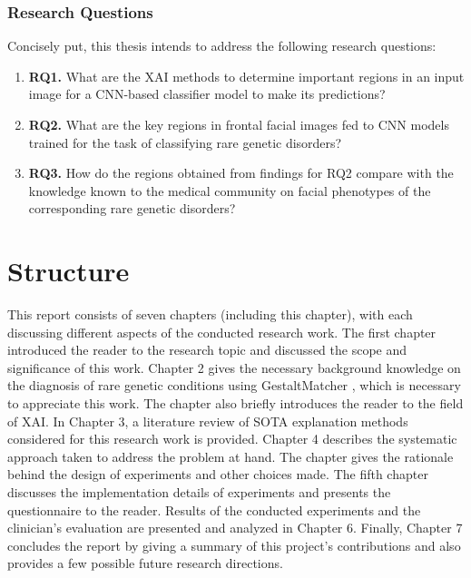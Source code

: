 \documentclass[../report.tex]{subfiles}
\begin{document}
 	\subsubsection{Research Questions} \label{sec_rq}
 	Concisely put, this thesis intends to address the following research questions:%
 	\begin{enumerate}
 		\item [] \textbf{RQ1.} What are the XAI methods to determine important regions in an input image for a CNN-based classifier model to make its predictions?  
 		\item [] \textbf{RQ2.} What are the key regions in frontal facial images fed to CNN models trained for the task of classifying rare genetic disorders?
 		\item [] \textbf{RQ3.} How do the regions obtained from findings for RQ2 compare with the knowledge known to the medical community on facial phenotypes of the corresponding rare genetic disorders? 
 	\end{enumerate}
 
 	\section{Structure}
 	\noindent
 	This report consists of seven chapters (including this chapter), with each discussing different aspects of the conducted research work. The first chapter introduced the reader to the research topic and discussed the scope and significance of this work. Chapter 2 gives the necessary background knowledge on the diagnosis of rare genetic conditions using GestaltMatcher \cite{hsieh2022gestaltmatcher}, which is necessary to appreciate this work. The chapter also briefly introduces the reader to the field of XAI. In Chapter 3, a literature review of SOTA explanation methods considered for this research work is provided. Chapter 4 describes the systematic approach taken to address the problem at hand. The chapter gives the rationale behind the design of experiments and other choices made. The fifth chapter discusses the implementation details of experiments and presents the questionnaire to the reader. Results of the conducted experiments and the clinician's evaluation are presented and analyzed in Chapter 6. Finally, Chapter 7 concludes the report by giving a summary of this project's contributions and also provides a few possible future research directions. 
 	
 	
\end{document}
